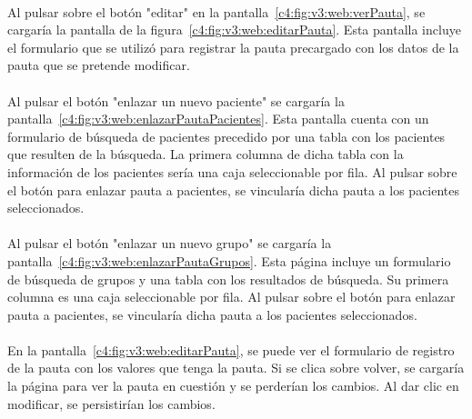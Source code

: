 \paragraph{}
Al pulsar sobre el botón "editar" en la pantalla~\ref{c4:fig:v3:web:verPauta}, se cargaría la pantalla de la figura~\ref{c4:fig:v3:web:editarPauta}. Esta pantalla incluye el formulario que se utilizó para registrar la pauta precargado con los datos de la pauta que se pretende modificar.

\paragraph{}
Al pulsar el botón "enlazar un nuevo paciente" se cargaría la pantalla~\ref{c4:fig:v3:web:enlazarPautaPacientes}. Esta pantalla cuenta con un formulario de búsqueda de pacientes precedido por una tabla con los pacientes que resulten de la búsqueda. La primera columna de dicha tabla con la información de los pacientes sería una caja seleccionable por fila. Al pulsar sobre el botón para enlazar pauta a pacientes, se vincularía dicha pauta a los pacientes seleccionados.

\paragraph{}
Al pulsar el botón "enlazar un nuevo grupo" se cargaría la pantalla~\ref{c4:fig:v3:web:enlazarPautaGrupos}. Esta página incluye un formulario de búsqueda de grupos y una tabla con los resultados de búsqueda. Su primera columna es una caja seleccionable por fila. Al pulsar sobre el botón para enlazar pauta a pacientes, se vincularía dicha pauta a los pacientes seleccionados.

\paragraph{}
En la pantalla~\ref{c4:fig:v3:web:editarPauta}, se puede ver el formulario de registro de la pauta con los valores que tenga la pauta. Si se clica sobre volver, se cargaría la página para ver la pauta en cuestión y se perderían los cambios. Al dar clic en modificar, se persistirían los cambios.

